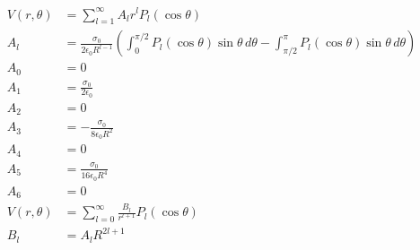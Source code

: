 \documentclass{article}
\begin{document}
\begin{align*}
  V(r, \theta) & = \sum_{l = 1}^\infty A_l r^l P_l(\cos \theta)                                                                                                                                 \\
  A_l          & = \frac{\sigma_0}{2 \epsilon_0 R^{l - 1}} \left( \int_0^{\pi / 2} P_l(\cos \theta) \sin \theta \,d \theta - \int_{\pi / 2}^\pi P_l(\cos \theta) \sin \theta \,d \theta \right) \\
  A_0          & = 0                                                                                                                                                                            \\
  A_1          & = \frac{\sigma_0}{2 \epsilon_0}                                                                                                                                                \\
  A_2          & = 0                                                                                                                                                                            \\
  A_3          & = -\frac{\sigma_0}{8 \epsilon_0 R^2}                                                                                                                                           \\
  A_4          & = 0                                                                                                                                                                            \\
  A_5          & = \frac{\sigma_0}{16 \epsilon_0 R^4}                                                                                                                                           \\
  A_6          & = 0                                                                                                                                                                            \\
  V(r, \theta) & = \sum_{l = 0}^\infty \frac{B_l}{r^{l + 1}} P_l(\cos \theta)                                                                                                                   \\
  B_l          & = A_l R^{2 l + 1}                                                                                                                                                              \\

\end{align*}
\end{document}
